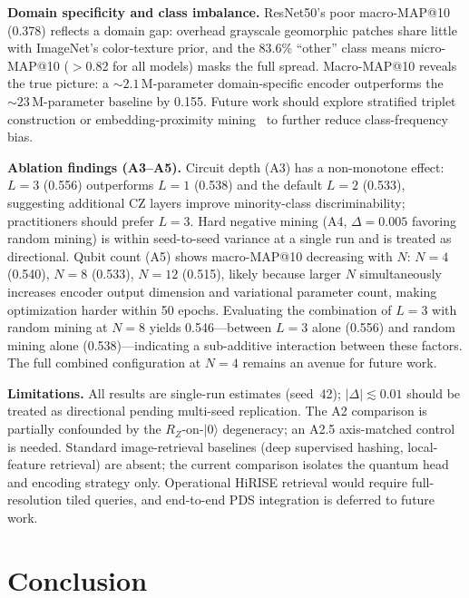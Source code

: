 \documentclass[conference,a4paper]{IEEEtran}
\newcommand{\RZ}{R_Z}
\begin{document}
\textbf{Domain specificity and class imbalance.}
ResNet50's poor macro-MAP@10 (0.378) reflects a domain gap: overhead
grayscale geomorphic patches share little with ImageNet's color-texture
prior, and the 83.6\% ``other'' class means micro-MAP@10 ($>$0.82 for all
models) masks the full spread.
Macro-MAP@10 reveals the true picture: a ${\sim}2.1\,$M-parameter domain-specific
encoder outperforms the ${\sim}23\,$M-parameter baseline by 0.155.
Future work should explore stratified triplet construction or
embedding-proximity mining~\cite{harwood2017smartmining} to further reduce
class-frequency bias.

\textbf{Ablation findings (A3--A5).}
Circuit depth (A3) has a non-monotone effect: $L=3$ (0.556) outperforms
$L=1$ (0.538) and the default $L=2$ (0.533), suggesting additional CZ
layers improve minority-class discriminability; practitioners should
prefer $L=3$.
Hard negative mining (A4, $\Delta=0.005$ favoring random mining) is
within seed-to-seed variance at a single run and is treated as directional.
Qubit count (A5) shows macro-MAP@10 decreasing with $N$: $N=4$ (0.540),
$N=8$ (0.533), $N=12$ (0.515), likely because larger $N$ simultaneously
increases encoder output dimension and variational parameter count, making
optimization harder within 50 epochs.
Evaluating the combination of $L=3$ with random mining at $N=8$ yields
0.546—between $L=3$ alone (0.556) and random mining alone (0.538)—indicating
a sub-additive interaction between these factors.
The full combined configuration at $N=4$ remains an avenue for future work.

\textbf{Limitations.}
All results are single-run estimates (seed~42); $|\Delta|\lesssim0.01$
should be treated as directional pending multi-seed replication.
The A2 comparison is partially confounded by the $\RZ$-on-$|0\rangle$
degeneracy; an A2.5 axis-matched control is needed.
Standard image-retrieval baselines (deep supervised hashing,
local-feature retrieval) are absent; the current comparison isolates
the quantum head and encoding strategy only.
Operational HiRISE retrieval would require full-resolution tiled queries,
and end-to-end PDS integration is deferred to future work.

\section{Conclusion}
\label{sec:conclusion}
\end{document}
